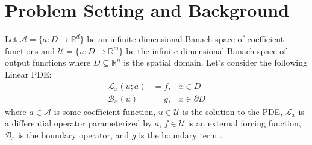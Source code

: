 \documentclass[12pt]{article}
\begin{document}


\section{Problem Setting and Background} \label{sec:background}

Let $\mathcal{A} = \{a: D \to \mathbb{R}^d\}$ be an infinite-dimensional Banach space of coefficient functions and $\mathcal{U} = \{u: D \to \mathbb{R}^m\}$ be the infinite dimensional Banach space of output functions where $D \subseteq \mathbb{R}^n$ is the spatial domain. Let's consider the following Linear PDE:
\begin{align}
    \mathcal{L}_{x}\left(u;a\right) &= f ,&x \in D \label{eq:mainpde}\\
    \mathcal{B}_{x}\left(u\right) &= g ,& x \in \partial D
\end{align}
where $a \in \mathcal{A} $ is some coefficient function,  $u \in \mathcal{U}$ is the solution to the PDE, $\mathcal{L}_x$ is a differential operator parameterized by $a$,  $f \in \mathcal{U}$ is an external forcing function, $\mathcal{B}_{x}$ is the boundary operator, and $g$ is the boundary term .  
\end{document}
